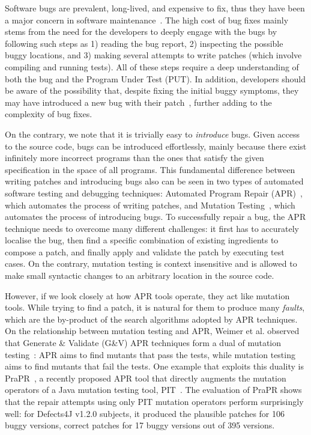 \documentclass[conference]{IEEEtran}
\def\d4j{Defects4J\xspace}
\begin{document}
Software bugs are prevalent, long-lived, and expensive to fix, thus they have 
been a major concern in software maintenance~\cite{planning2002economic,
weiss2007long}. The high cost of bug fixes mainly stems from the need for the 
developers to deeply engage with the bugs by following such steps as 1) reading 
the bug report, 2) inspecting the possible buggy locations, and 3) making 
several attempts to write patches (which involve compiling and running tests). 
All of these steps require a deep understanding of both the bug and the Program 
Under Test (PUT). In addition, developers should be aware of the possibility 
that, despite fixing the initial buggy symptoms, they may have introduced a new 
bug with their patch~\cite{yin2011fixes, le2013automatic}, further adding to 
the complexity of bug fixes.

On the contrary, we note that it is trivially easy to \emph{introduce} bugs.
Given access to the source code, bugs can be introduced effortlessly, mainly
because there exist infinitely more incorrect programs than the ones that
satisfy the given specification in the space of all programs. This fundamental
difference between writing patches and introducing bugs also can be seen in two
types of automated software testing and debugging techniques: Automated Program
Repair (APR)~\cite{goues2019automated}, which automates the process of
writing patches, and Mutation Testing~\cite{papadakis2019mutation}, which automates 
the process of introducing bugs. To successfully repair a bug, the
APR technique needs to overcome many different challenges: it first has to
accurately localise the bug, then find a specific combination of existing
ingredients to compose a patch, and finally apply and validate the patch by
executing test cases. On the contrary, mutation testing is context insensitive
and is allowed to make small syntactic changes to an arbitrary location in the
source code.

However, if we look closely at how APR tools operate, they act like mutation
tools. While trying to find a patch, it is natural for them to produce many 
\textit{faults}, which are the by-product of the search algorithms adopted by 
APR techniques. On the relationship between mutation testing and APR, Weimer et 
al. observed that Generate \& Validate (G\&V) APR techniques form a dual of mutation 
testing~\cite{Weimer2013ma}: APR aims to find mutants that pass the tests, 
while mutation testing aims to find mutants that fail the tests. One example 
that exploits this duality is PraPR~\cite{ghanbari2019practical}, a recently 
proposed APR tool that directly augments the mutation operators of a Java 
mutation testing tool, PIT~\cite{coles2016pit}. The evaluation of PraPR shows 
that the repair attempts using only PIT mutation operators perform 
surprisingly well: for \d4j v1.2.0 subjects, it produced the plausible patches for 106 
buggy versions, correct patches for 17 buggy versions out of 395 versions.
\end{document}

